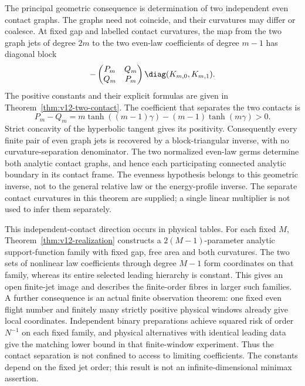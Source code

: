 The principal geometric consequence is determination of two
independent even contact graphs. The graphs need not coincide, and
their curvatures may differ or coalesce. At fixed gap and labelled
contact curvatures, the map from the two graph jets of degree $2m$
to the two even-law coefficients of degree $m-1$ has diagonal block
\[
 -\begin{pmatrix}P_m&Q_m\\Q_m&P_m\end{pmatrix}
                  \diag(K_{m,0},K_{m,1}).
\]
The positive constants and their explicit formulas are given in
Theorem~\ref{thm:v12-two-contact}. The coefficient that separates
the two contacts is
\[
 P_m-Q_m=m\tanh((m-1)\gamma)-(m-1)\tanh(m\gamma)>0.
\]
Strict concavity of the hyperbolic tangent gives its positivity.
Consequently every finite pair of even graph jets is recovered by a
block-triangular inverse, with no curvature-separation denominator.
The two normalized even-law germs determine both analytic contact
graphs, and hence each participating connected analytic boundary in
its contact frame. The evenness hypothesis belongs to this geometric
inverse, not to the general relative law or the energy-profile inverse.
The separate contact curvatures in this theorem are supplied; a single
linear multiplier is not used to infer them separately.

This independent-contact direction occurs in physical tables. For each
fixed $M$, Theorem~\ref{thm:v12-realization} constructs a
$2(M-1)$-parameter analytic support-function family with fixed gap,
free area and both curvatures. The two sets of nonlinear law
coefficients through degree $M-1$ form coordinates on that family,
whereas its entire selected leading hierarchy is constant. This gives
an open finite-jet image and describes the finite-order fibres in
larger such families. A further consequence is an actual finite
observation theorem: one fixed even flight number and finitely many
strictly positive physical windows already give local coordinates.
Independent binary preparations achieve squared risk of order $N^{-1}$
on each fixed family, and physical alternatives with identical leading
data give the matching lower bound in that finite-window experiment.
Thus the contact separation is not confined to access to limiting
coefficients. The constants depend on the fixed jet order; this result
is not an infinite-dimensional minimax assertion.

